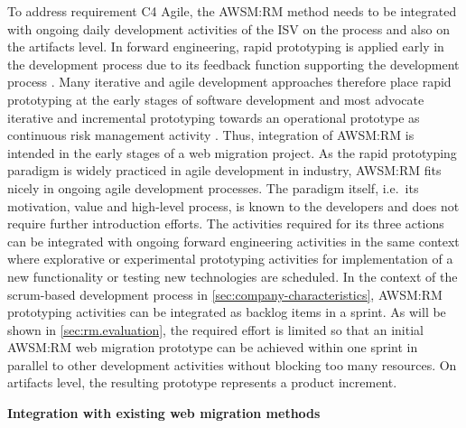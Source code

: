 To address requirement C4 Agile, the AWSM:RM method needs to be integrated with ongoing daily development activities of the ISV on the process and also on the artifacts level.
In forward engineering, rapid prototyping is applied early in the development process due to its feedback function supporting the development process \autocite{ISO/IEEE24765Vocabulary}.
Many iterative and agile development approaches therefore place rapid prototyping at the early stages of software development and most advocate iterative and incremental prototyping towards an operational prototype as continuous risk management activity \autocite{Boehm1988Spiral,Martin1991RAD,Simpson2016,Stapleton1997DSDM,DSDMConsortium2014,Rivero2013MockupDD,Rivero2013,Rivero2014Electra}.
Thus, integration of AWSM:RM is intended in the early stages of a web migration project.
As the rapid prototyping paradigm is widely practiced in agile development in industry, AWSM:RM fits nicely in ongoing agile development processes.
The paradigm itself, i.e.~its motivation, value and high-level process, is known to the developers and does not require further introduction efforts.
The activities required for its three actions can be integrated with ongoing forward engineering activities in the same context where explorative or experimental prototyping \autocite{Wallmueller2001SoftwareQuality} activities for implementation of a new functionality or testing new technologies are scheduled.
In the context of the scrum-based development process in \cref{sec:company-characteristics}, AWSM:RM prototyping activities can be integrated as backlog items in a sprint.
As will be shown in \cref{sec:rm.evaluation}, the required effort is limited so that an initial AWSM:RM web migration prototype can be achieved within one sprint in parallel to other development activities without blocking too many resources.
On artifacts level, the resulting prototype represents a product increment.

\textbf{Integration with existing web migration methods}

